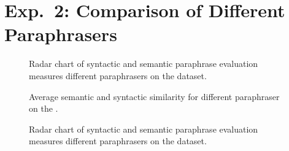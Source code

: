 \section{Exp.\ 2: Comparison of Different Paraphrasers}
\label{sec:app_paraphrases}

\begin{figure}[H]
    \centering
    
    \caption[Paraphrase evaluation radar chart on the \dataBlog{} dataset.]{Radar chart of syntactic and semantic paraphrase evaluation measures different paraphrasers on the \dataBlog{} dataset.}
    \label{fig:radar_blog}
\end{figure}


\begin{figure}[H]
    \centering
    
    \caption[Comparison of paraphrasers on the \dataGutenberg{} dataset.]{Average semantic and syntactic similarity for different paraphraser on the \dataGutenberg{}.}
    \label{fig:sem_syn_gutenberg}
\end{figure}

\begin{figure}[H]
    \centering
    
    \caption[Paraphrase evaluation radar chart on the \dataGutenberg{} dataset.]{Radar chart of syntactic and semantic paraphrase evaluation measures different paraphrasers on the \dataGutenberg{} dataset.}
    \label{fig:radar_gutenberg}
\end{figure}
